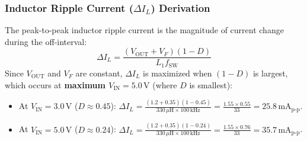 \documentclass[11pt,a4paper]{article}
\begin{document}
\subsubsection{\texorpdfstring{Inductor Ripple Current ($\Delta I_L$) Derivation}{Inductor Ripple Current (Delta IL) Derivation}}
The peak-to-peak inductor ripple current is the magnitude of current change during the off-interval:
\begin{equation}
    \Delta I_L = \frac{(V_{\mathrm{OUT}} + V_F)(1 - D)}{L_1 f_{\mathrm{SW}}}
    \label{eq:delta_il_exact}
\end{equation}
Since $V_{\mathrm{OUT}}$ and $V_F$ are constant, $\Delta I_L$ is maximized when $(1 - D)$ is largest, which occurs at \textbf{maximum $V_{\mathrm{IN}} = 5.0\,\mathrm{V}$} (where $D$ is smallest):
\begin{itemize}
    \item At $V_{\mathrm{IN}} = 3.0\,\mathrm{V}$ ($D \approx 0.45$): $\Delta I_L = \frac{(1.2 + 0.35)(1 - 0.45)}{330\,\mu\mathrm{H} \times 100\,\mathrm{kHz}} = \frac{1.55 \times 0.55}{33} = \mathbf{25.8\,\mathrm{mA}_{\mathrm{p\text{-}p}}}$.
    \item At $V_{\mathrm{IN}} = 5.0\,\mathrm{V}$ ($D \approx 0.24$): $\Delta I_L = \frac{(1.2 + 0.35)(1 - 0.24)}{330\,\mu\mathrm{H} \times 100\,\mathrm{kHz}} = \frac{1.55 \times 0.76}{33} = \mathbf{35.7\,\mathrm{mA}_{\mathrm{p\text{-}p}}}$.
\end{itemize}
\end{document}
